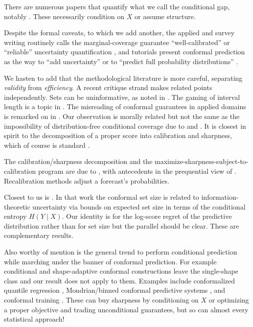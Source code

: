 \documentclass[11pt]{article}
\theoremstyle{definition}
\begin{document}
There are numerous papers that quantify what we call the conditional gap, notably \citet{braun2025conditional}. These
necessarily condition on $X$ or assume structure.


Despite the formal caveats, to which we add another, the applied and survey writing routinely calls the marginal-coverage guarantee
``well-calibrated'' or ``reliable'' uncertainty quantification
\citep{bellotti2025trustworthy}, and tutorials present conformal prediction as the way to
``add uncertainty'' \citep{tds_adduncertainty} or to ``predict full probability
distributions'' \citep{manokhin_fulldist}. 

We hasten to add that the methodological literature is more careful,
separating \emph{validity} from \emph{efficiency}. A recent critique strand makes related points independently. Sets can be uninformative, as noted in \citet{recht2024cover}. The gaming
of interval length is a topic in \citet{min2026coveragelength}. The misreading of conformal guarantees in applied domains is remarked
on in \citet{pitfalls2025medical}. Our observation is morally related but not the same as the impossibility of distribution-free conditional
coverage due to \citet{lei2014distribution} and \citet{barber2021limits}. It is closest in spirit to 
the decomposition of a proper score into calibration and sharpness, which of course is standard
\citep{gneiting2007probabilistic,gneiting2007strictly}. 

The calibration/sharpness decomposition and the maximize-sharpness-subject-to-calibration
program are due to \citet{gneiting2007probabilistic,gneiting2007strictly}, with antecedents
in the prequential view of \citet{dawid1984present}. Recalibration methods
\citep{platt1999probabilistic,zadrozny2002transforming,guo2017calibration,kuleshov2018accurate}
adjust a forecast's probabilities. 

Closest to us is \citet{correia2024information}. In that work the conformal set size is related to
information-theoretic uncertainty via bounds on expected set size in terms of the conditional
entropy $H(Y\mid X)$. Our identity is for the log-score regret of the predictive
distribution rather than for set size but the parallel should be clear. These are complementary
results. 

Also worthy of mention is the general trend to perform conditional prediction while marching under the 
banner of conformal prediction. For example conditional and shape-adaptive conformal constructions
leave the single-shape class and our result does not apply to them. Examples include conformalized quantile regression
\citep{romano2019conformalized}, Mondrian/binned conformal predictive systems
\citep{bostrom2021mondrian,toccaceli2026crps}, and conformal training
\citep{stutz2022learning}. These can buy sharpness by conditioning on $X$ or optimizing a
proper objective and trading unconditional guarantees, but so can almost every statistical approach!
\end{document}
